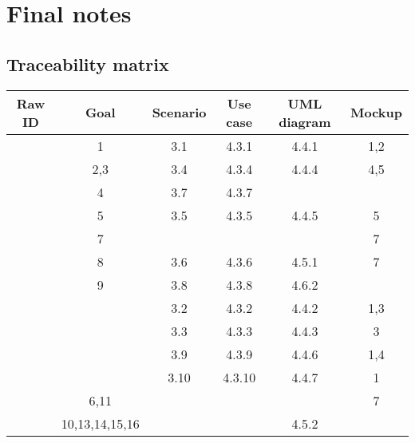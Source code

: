 \pagebreak
\section{Final notes}

\subsection{Traceability matrix}


\newcommand{\Row}[5]{
	\stepcounter{RowID}
	\arabic{RowID} & #1 & #2 & #3 & #4 & #5 \\

}

\begin{center}
	\vspace{0.2cm}
	\begin{tabular}{c c c c c c}
			\hline
			\textbf{Raw ID}	& \textbf{Goal}	& \textbf{Scenario}	& \textbf{Use case}	& \textbf{UML diagram} & \textbf{Mockup}	\\
			\hline
			\Row{1}{3.1}{4.3.1}{4.4.1}{1,2}
			\Row{2,3}{3.4}{4.3.4}{4.4.4}{4,5}
			\Row{4}{3.7}{4.3.7}{}{}
			\Row{5}{3.5}{4.3.5}{4.4.5}{5}
			\Row{7}{}{}{}{7}
			\Row{8}{3.6}{4.3.6}{4.5.1}{7}
			\Row{9}{3.8}{4.3.8}{4.6.2}{}
			\Row{}{3.2}{4.3.2}{4.4.2}{1,3}
			\Row{}{3.3}{4.3.3}{4.4.3}{3}
			\Row{}{3.9}{4.3.9}{4.4.6}{1,4}
			\Row{}{3.10}{4.3.10}{4.4.7}{1}
			\Row{6,11}{}{}{}{7}
			\Row{10,13,14,15,16}{}{}{4.5.2}{}
	
			\hline
	\end{tabular}
\end{center}
